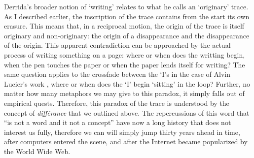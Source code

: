 Derrida's broader notion of `writing' relates to what he calls an `originary' trace. As I described earlier, the inscription of the trace contains from the start its own erasure. This means that, in a reciprocal motion, the origin of the trace is itself originary and non-originary: the origin of a disappearance and the disappearance of the origin. This apparent contradiction can be approached by the actual process of writing something on a page: where or when does the writting begin, when the pen touches the paper or when the paper lends itself for writing? The same question applies to the crossfade between the `I's in the case of Alvin Lucier's work , where or when does the `I' begin `sitting' in the loop? Further, no matter how many metaphors we may give to this paradox, it simply falls out of empirical quests. Therefore, this paradox of the trace is understood by the concept of \textit{différance} that we outlined above. The repercussions of this word that ``is not a word and it not a concept'' have now a long history that does not interest us fully, therefore we can will simply jump thirty years ahead in time, after computers entered the scene, and after the Internet became popularized by the World Wide Web.

